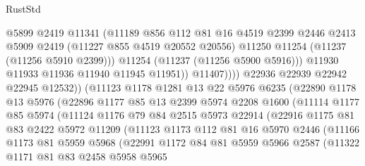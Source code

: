 \begin{lexlean}{RustStd}
\begin{coremodule}
                          @5899
                          @2419
                          @11341
                          (@11189
                            @856
                            @112
                            @81
                            @16
                            @4519
                            @2399
                            @2446
                            @2413
                            @5909
                            @2419
                            (@11227 @855 @4519 @20552 @20556)
                            @11250
                            @11254
                            (@11237 (@11256 @5910 @2399)))
                          @11254
                          (@11237 (@11256 @5900 @5916)))
                        @11930
                        @11933
                        @11936
                        @11940
                        @11945
                        @11951))
                    @11407))))
            @22936
            @22939
            @22942
            @22945
            @12532))
        (@11123
          @1178
          @1281
          @13
          @22
          @5976
          @6235
          (@22890
            @1178
            @13
            @5976
            (@22896
              @1177
              @85
              @13
              @2399
              @5974
              @2208
              @1600
              (@11114
                @1177
                @85
                @5974
                (@11124
                  @1176
                  @79
                  @84
                  @2515
                  @5973
                  @22914
                  (@22916
                    @1175
                    @81
                    @83
                    @2422
                    @5972
                    @11209
                    (@11123
                      @1173
                      @112
                      @81
                      @16
                      @5970
                      @2446
                      (@11166
                        @1173
                        @81
                        @5959
                        @5968
                        (@22991
                          @1172
                          @84
                          @81
                          @5959
                          @5966
                          @2587
                          (@11322
                            @1171
                            @81
                            @83
                            @2458
                            @5958
                            @5965

\end{coremodule}
\end{lexlean}
